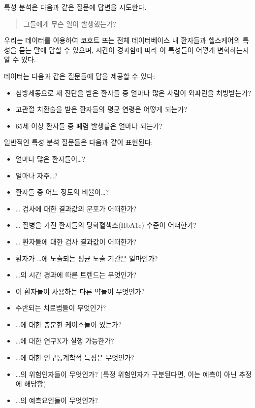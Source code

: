 \documentclass[11pt]{book}
\providecommand{\tightlist}{%
  \setlength{\itemsep}{0pt}\setlength{\parskip}{0pt}}
\theoremstyle{definition}
\theoremstyle{definition}
\theoremstyle{definition}
\theoremstyle{remark}
\begin{document}

특성 분석은 다음과 같은 질문에 답변을 시도한다.

\begin{quote}
그들에게 무슨 일이 발생했는가?
\end{quote}

우리는 데이터를 이용하여 코호트 또는 전체 데이터베이스 내 환자들과
헬스케어의 특성을 묻는 말에 답할 수 있으며, 시간이 경과함에 따라 이
특성들이 어떻게 변화하는지 알 수 있다.

데이터는 다음과 같은 질문들에 답을 제공할 수 있다:

\begin{itemize}
\tightlist
\item
  심방세동으로 새 진단을 받은 환자들 중 얼마나 많은 사람이 와파린을
  처방받는가?
\item
  고관절 치환술을 받은 환자들의 평균 연령은 어떻게 되는가?
\item
  65세 이상 환자들 중 폐렴 발생률은 얼마나 되는가?
\end{itemize}

일반적인 특성 분석 질문들은 다음과 같이 표현된다:

\begin{itemize}
\tightlist
\item
  얼마나 많은 환자들이\ldots{}?
\item
  얼마나 자주\ldots{}?
\item
  환자들 중 어느 정도의 비율이\ldots{}?
\item
  \ldots{} 검사에 대한 결과값의 분포가 어떠한가?
\item
  \ldots{} 질병을 가진 환자들의 당화혈색소(HbA1c) 수준이 어떠한가?
\item
  \ldots{} 환자들에 대한 검사 결과값이 어떠한가?
\item
  환자가 \ldots{}에 노출되는 평균 노출 기간은 얼마인가?
\item
  \ldots{}의 시간 경과에 따른 트렌드는 무엇인가?
\item
  이 환자들이 사용하는 다른 약들이 무엇인가?
\item
  수반되는 치료법들이 무엇인가?
\item
  \ldots{}에 대한 충분한 케이스들이 있는가?
\item
  \ldots{}에 대한 연구X가 실행 가능한가?
\item
  \ldots{}에 대한 인구통계학적 특징은 무엇인가?
\item
  \ldots{}의 위험인자들이 무엇인가? (특정 위험인자가 구분된다면, 이는
  예측이 아닌 추정에 해당함)
\item
  \ldots{}의 예측요인들이 무엇인가?
\end{itemize}
\end{document}
